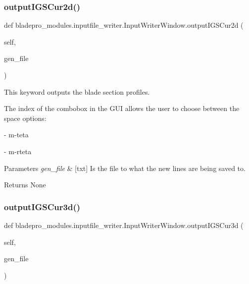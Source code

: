 \subsubsection{\texorpdfstring{output\+I\+G\+S\+Cur2d()}{outputIGSCur2d()}}
{\footnotesize\ttfamily def bladepro\+\_\+modules.\+inputfile\+\_\+writer.\+Input\+Writer\+Window.\+output\+I\+G\+S\+Cur2d (\begin{DoxyParamCaption}\item[{}]{self,  }\item[{}]{gen\+\_\+file }\end{DoxyParamCaption})}



This keyword outputs the blade section profiles. 

The index of the combobox in the G\+UI allows the user to choose between the space options\+:

\begin{DoxyItemize}
\item {} -\/ m\textquotesingle{}-\/teta \item {} -\/ m-\/rteta\end{DoxyItemize}

\begin{DoxyParams}{Parameters}
{\em gen\+\_\+file} & \mbox{[}txt\mbox{]} Is the file to what the new lines are being saved to. \\
\hline
\end{DoxyParams}
\begin{DoxyReturn}{Returns}
None 
\end{DoxyReturn}
\hypertarget{a00070_a394d61e8d66fde036f84746086d6c687}{}\label{a00070_a394d61e8d66fde036f84746086d6c687} 
\subsubsection{\texorpdfstring{output\+I\+G\+S\+Cur3d()}{outputIGSCur3d()}}
{\footnotesize\ttfamily def bladepro\+\_\+modules.\+inputfile\+\_\+writer.\+Input\+Writer\+Window.\+output\+I\+G\+S\+Cur3d (\begin{DoxyParamCaption}\item[{}]{self,  }\item[{}]{gen\+\_\+file }\end{DoxyParamCaption})}



